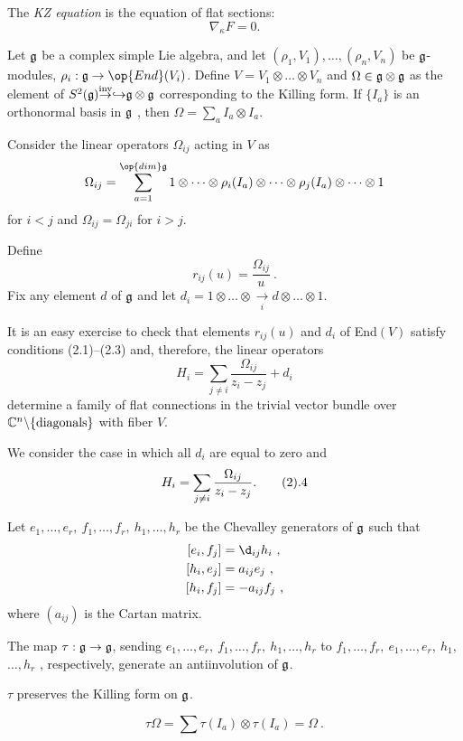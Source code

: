 The {\it KZ equation} is the equation of flat sections:
$$
\nabla _{\kappa} F = 0.
$$

Let $\frak g$ be a complex simple Lie algebra, and
let $(\rho_1,V_1),\dots
,(\rho_n,V_n)$ be $\frak g$-modules, $\rho_i :\frak g \to {\op{End}}(V_i)$.
Define $V=V_1\otimes\dots\otimes V_n$ and
$\Omega\in\frak g\otimes\frak g$ as the element of
$S^2(\frak g) {\overset{\text{inv}}\to\hookrightarrow}
\frak g\otimes\frak g$ corresponding to the Killing form.
If $\{ I_a\}$ is an orthonormal basis in $\frak g$ , then
\newline $\Omega =\sum_{a} I_a\otimes I_a$.

Consider the linear operators $\Omega_{ij}$ acting in $V$ as
$$
\Omega_{ij} = \sum^{{\op{dim }}\frak g}_{a=1}
1\otimes\dots\otimes
\rho_i(I_a) \otimes\dots\otimes \rho_j(I_a)\otimes\dots\otimes 1
$$
for $i < j$ and $\Omega_{ij}=\Omega_{ji}$ for $i > j$.

Define
$$
r_{ij}(u) = \frac{\Omega_{ij}}{u}  \ .
$$
Fix any element $d$ of $\frak g$ and let
$d_i=1\otimes\dots\otimes {\underset{i}\to d}\otimes\dots\otimes
1$.

It is an easy exercise to check that elements $r_{ij}(u)$ and $d_i$ of
End$(V)$ satisfy conditions (2.1)--(2.3) and, therefore, the  linear
operators
$$
H_i = \sum_{j\neq i} \frac{\Omega_{ij}}{z_i-z_j} + d_i
$$
determine a family  of flat connections in the trivial vector bundle
over $\Bbb C^n\backslash\{ {\text{diagonals}}\}$ with fiber $V$.

We consider the case in which all $d_i$ are equal to zero and
$$
H_i = \sum_{j\neq i} \frac{\Omega_{ij}}{z_i-z_j}.   \tag 2.4
$$


Let $e_1,\dots ,e_r, \ f_1,\dots ,f_r, \ h_1,\dots ,h_r$ be the
Chevalley generators of $\frak g$ such that
$$
\aligned
[e_i,f_j] &= \d_{ij} h_i \ , \\
[h_i,e_j] &= a_{ij}e_j   \ , \\
[h_i,f_j] &= -a_{ij}f_j  \ ,
\endaligned
$$
where $(a_{ij})$ is the Cartan matrix.

The map $\tau : \frak g \to \frak g$,
sending $e_1,\dots ,e_r, \ f_1,\dots ,f_r, \
h_1, \dots ,h_r$ to $f_1,\dots ,f_r, \ e_1, \dots ,e_r, \ h_1,$
\newline
$\dots ,
h_r$ , respectively, generate an antiinvolution of $\frak g$.

  $\tau$ preserves the Killing form on
$\frak g$.
\endproclaim


$$
\tau\Omega =\sum \tau(I_a)\otimes\tau(I_a) = \Omega \ .
$$
\endproclaim

